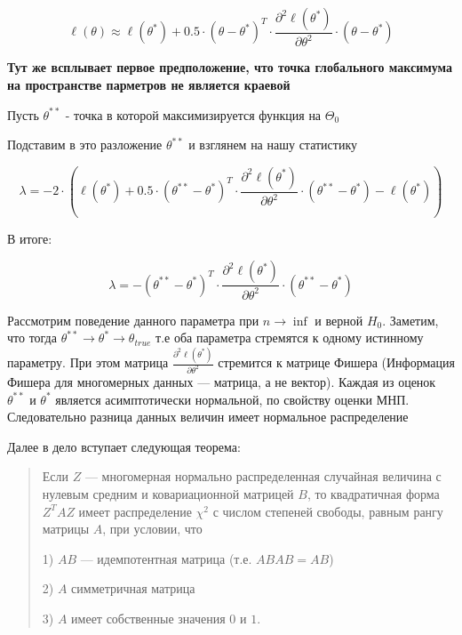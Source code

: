 \documentclass{article}
\begin{document}
    \quad

    \begin{equation}
        \ell(\theta) \approx \ell(\theta^{*}) +
        0.5 \cdot (\theta - \theta^{*})^{T} \cdot \frac{\partial^{2} \ell(\theta^{*})}{\partial \theta^{2}} \cdot (\theta - \theta^{*})
    \end{equation}

    \quad

    \textbf{Тут же всплывает первое предположение, что точка глобального максимума на пространстве парметров не является краевой}

    \quad

    Пусть $\theta^{**}$ - точка в которой максимизируется функция на $\Theta_{0}$

    Подставим в это разложение $\theta^{**}$ и взглянем на нашу статистику

    \begin{equation}
        \lambda = -2 \cdot (\ell(\theta^{*}) +
        0.5 \cdot (\theta^{**} - \theta^{*})^{T} \cdot \frac{\partial^{2} \ell(\theta^{*})}{\partial \theta^{2}} \cdot (\theta^{**} - \theta^{*}) - \ell(\theta^{*}))
    \end{equation}

    \quad

    В итоге:

    \quad

    \begin{equation}
         \lambda = -(\theta^{**} - \theta^{*})^{T} \cdot \frac{\partial^{2} \ell(\theta^{*})}{\partial \theta^{2}} \cdot (\theta^{**} - \theta^{*})
    \end{equation}

    Рассмотрим поведение данного параметра при $n \rightarrow \inf$ и верной $H_{0}$.
    Заметим, что тогда $\theta^{**} \rightarrow \theta^{*} \rightarrow \theta_{true}$ т.е оба параметра стремятся к одному истинному параметру.
    При этом матрица $\frac{\partial^{2} \ell(\theta^{*})}{\partial \theta^{2}}$  стремится к матрице Фишера (Информация Фишера для многомерных данных --- матрица, а не вектор).
    Каждая из оценок $\theta^{**}$ и $\theta^{*}$ является асимптотически нормальной, по свойству оценки МНП.
    Следовательно разница данных величин имеет нормальное распределение

    \quad

    Далее в дело вступает следующая теорема:

    \begin{quote}

    Если $Z$ --- многомерная нормально распределенная случайная величина с нулевым средним и ковариационной матрицей $B$,
    то квадратичная форма $Z^{T} A Z$ имеет распределение $\chi^{2}$ с числом степеней свободы, равным рангу матрицы $A$,
    при условии, что

    1) $AB$ --- идемпотентная матрица (т.е. $A B A B= A B$)

    2) $A$ симметричная матрица

    3) $A$ имеет собственные значения $0$ и $1$.

    \end{quote}
\end{document}
